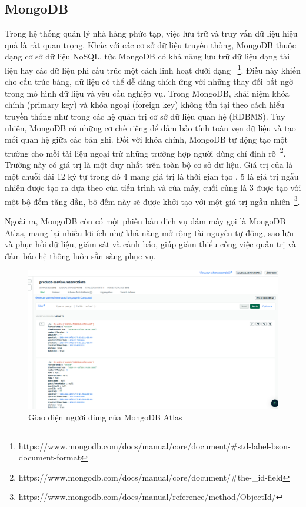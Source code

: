\subsection{MongoDB}
Trong hệ thống quản lý nhà hàng phức tạp, việc lưu trữ và truy vấn dữ liệu hiệu quả là rất quan trọng.
Khác với các cơ sở dữ liệu truyền thống, MongoDB thuộc dạng cơ sở dữ liệu NoSQL, tức MongoDB có khả năng lưu trữ dữ liệu dạng tài liệu hay các dữ liệu phi cấu trúc một cách linh hoạt dưới dạng ~\footnote{https://www.mongodb.com/docs/manual/core/document/\#std-label-bson-document-format}. Điều này khiến cho cấu trúc bảng, dữ liệu có thể dễ dàng thích ứng với những thay đổi bất ngờ trong mô hình dữ liệu và yêu cầu nghiệp vụ.
Trong MongoDB, khái niệm khóa chính (primary key) và khóa ngoại (foreign key) không tồn tại theo cách hiểu truyền thống như trong các hệ quản trị cơ sở dữ liệu quan hệ (RDBMS). Tuy nhiên, MongoDB có những cơ chế riêng để đảm bảo tính toàn vẹn dữ liệu và tạo mối quan hệ giữa các bản ghi.
Đối với khóa chính, MongoDB tự động tạo một trường  cho mỗi tài liệu ngoại trừ những trường hợp người dùng chỉ định rõ~\footnote{https://www.mongodb.com/docs/manual/core/document/\#the-\_id-field}.
Trường này có giá trị là một  duy nhất trên toàn bộ cơ sở dữ liệu.
Giá trị của  là một chuỗi  dài 12 ký tự trong đó 4  mang giá trị là thời gian tạo , 5  là giá trị ngẫu nhiên được tạo ra dựa theo  của tiến trình và của máy, cuối cùng là 3  được tạo với một bộ đếm tăng dần, bộ đếm này sẽ được khởi tạo với một giá trị ngẫu nhiên~\footnote{https://www.mongodb.com/docs/manual/reference/method/ObjectId/}.

Ngoài ra, MongoDB còn có một phiên bản dịch vụ đám mây gọi là MongoDB Atlas, mang lại nhiều lợi ích như khả năng mở rộng tài nguyên tự động, sao lưu và phục hồi dữ liệu, giám sát và cảnh báo, giúp giảm thiểu công việc quản trị và đảm bảo hệ thống luôn sẵn sàng phục vụ.

\begin{figure}[h]
	\centering
	\includegraphics[width=\textwidth]{images/hChip/MongoDB/mongodb-preview.png}
	\caption{Giao diện người dùng của MongoDB Atlas}
	\label{fig:mongoDB-preview}
\end{figure}

